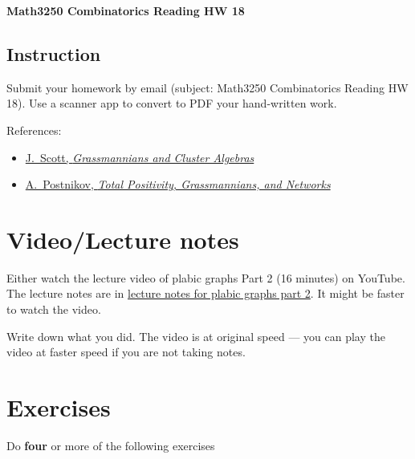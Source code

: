 \documentclass[10pt]{amsart}
\begin{document}
\begin{center}\textbf{Math3250 Combinatorics Reading HW 18}\end{center}




\subsection*{Instruction}


Submit your homework by email (subject: Math3250 Combinatorics Reading HW 18). Use a scanner app to convert to PDF your hand-written work. 

References:
\begin{itemize}
	\item 
\href{https://arxiv.org/abs/math/0311148}{J.~Scott, \emph{Grassmannians and Cluster Algebras}}
\item 
\href{https://math.mit.edu/~apost/papers/tpgrass.pdf}{A.~Postnikov, \emph{Total Positivity, Grassmannians, and Networks}}
\end{itemize}





\section*{Video/Lecture notes}
Either watch the lecture video of plabic graphs Part 2 (16 minutes) on YouTube. 
The lecture notes are in  \href{https://egunawan.github.io/combinatorics/notes/notes_plabic_graphs2.pdf}{lecture notes for plabic graphs part 2}.  It might be faster to watch the video. 

Write down what you did. 
The video is at original speed --- you can play the video at faster speed if you are not taking notes.




\section*{Exercises}

Do \textbf{four} or more of the following exercises
\end{document}
